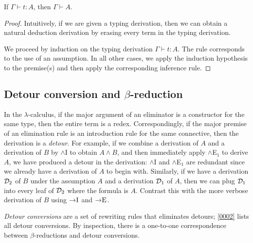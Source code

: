 \documentclass[a4paper]{article}
\begin{document}

\begin{theorem}\label{0001}
  If $\Gamma \vdash t : A$, then $\Gamma \vdash A$.
\end{theorem}
\begin{proof}
  Intuitively, if we are given a typing derivation, then we can obtain a natural deduction derivation by erasing every term in the typing derivation.
  
  We proceed by induction on the typing derivation $\Gamma \vdash t : A$.
  The rule \rVar{} corresponds to the use of an assumption.
  In all other cases, we apply the induction hypothesis to the premise(s) and then apply the corresponding inference rule.
\end{proof}

\subsection{Detour conversion and $\beta$-reduction}
\label{sec:0005}

In the $\lambda$-calculus, if the major argument of an eliminator is a constructor for the same type, then the entire term is a redex.
Correspondingly, if the major premise of an elimination rule is an introduction rule for the same connective, then the derivation is a \emph{detour}.
For example, if we combine a derivation of $A$ and a derivation of $B$ by $\wedge$I to obtain $A \wedge B$, and then immediately apply $\wedge$E$_1$ to derive $A$, we have produced a detour in the derivation: $\wedge$I and $\wedge$E$_1$ are redundant since we already have a derivation of $A$ to begin with.
Similarly, if we have a derivation $\mathcal{D}_2$ of $B$ under the assumption $A$ and a derivation $\mathcal{D}_1$ of $A$, then we can plug $\mathcal{D}_1$ into every leaf of $\mathcal{D}_2$ where the formula is $A$.
Contrast this with the more verbose derivation of $B$ using $\textsc{$\mathord{\to}$I}$ and $\textsc{$\mathord{\to}$E}$.

\emph{Detour conversions} are a set of rewriting rules that eliminates detours; \cref{0002} lists all detour conversions.
By inspection, there is a one-to-one correspondence between $\beta$-reductions and detour conversions.
\end{document}
